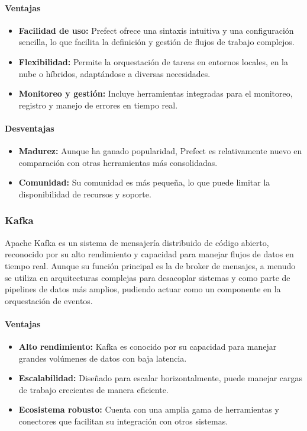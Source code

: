 \paragraph{Ventajas}
\begin{itemize}
    \item \textbf{Facilidad de uso:} Prefect ofrece una sintaxis intuitiva y una configuración sencilla, lo que facilita la definición y gestión de flujos de trabajo complejos.
    \item \textbf{Flexibilidad:} Permite la orquestación de tareas en entornos locales, en la nube o híbridos, adaptándose a diversas necesidades.
    \item \textbf{Monitoreo y gestión:} Incluye herramientas integradas para el monitoreo, registro y manejo de errores en tiempo real.
\end{itemize}

\paragraph{Desventajas}
\begin{itemize}
    \item \textbf{Madurez:} Aunque ha ganado popularidad, Prefect es relativamente nuevo en comparación con otras herramientas más consolidadas.
    \item \textbf{Comunidad:} Su comunidad es más pequeña, lo que puede limitar la disponibilidad de recursos y soporte.
\end{itemize}

\subsubsection{Kafka}
Apache Kafka es un sistema de mensajería distribuido de código abierto, reconocido por su alto rendimiento y capacidad para manejar flujos de datos en tiempo real. Aunque su función principal es la de broker de mensajes, a menudo se utiliza en arquitecturas complejas para desacoplar sistemas y como parte de pipelines de datos más amplios, pudiendo actuar como un componente en la orquestación de eventos.

\paragraph{Ventajas}
\begin{itemize}
    \item \textbf{Alto rendimiento:} Kafka es conocido por su capacidad para manejar grandes volúmenes de datos con baja latencia.
    \item \textbf{Escalabilidad:} Diseñado para escalar horizontalmente, puede manejar cargas de trabajo crecientes de manera eficiente.
    \item \textbf{Ecosistema robusto:} Cuenta con una amplia gama de herramientas y conectores que facilitan su integración con otros sistemas.
\end{itemize}

